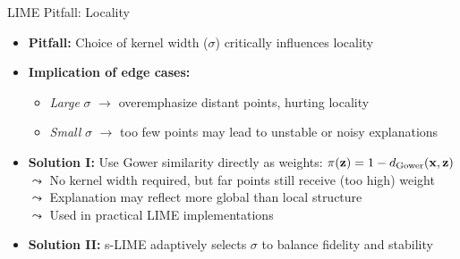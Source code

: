 \documentclass[10pt,compress,t,notes=noshow, xcolor=table]{beamer}
\begin{document}
\begin{frame}{LIME Pitfall: Locality }
\begin{itemize}
  \item \textbf{Pitfall:} Choice of kernel width (\(\sigma\)) critically influences locality
  \pause
  \item \textbf{Implication of edge cases:}
  \begin{itemize}
    \item \emph{Large} $\sigma$ $\rightarrow$ overemphasize distant points, hurting locality
    \item \emph{Small} $\sigma$ $\rightarrow$ too few points may lead to unstable or noisy explanations
  \end{itemize}
  \pause
  \item  \textbf{Solution I:} Use Gower similarity directly as weights: \( \pi(\mathbf{z}) = 1 - d_{\text{Gower}}(\mathbf{x}, \mathbf{z}) \)\\
  $\leadsto$ No kernel width required, but far points still receive (too high) weight\\
  $\leadsto$ Explanation may reflect more global than local structure\\
  $\leadsto$ Used in practical LIME implementations 
  \pause
  \item \textbf{Solution II:} s-LIME adaptively selects \(\sigma\) to balance fidelity and stability 
\end{itemize}
\end{frame}
\end{document}
